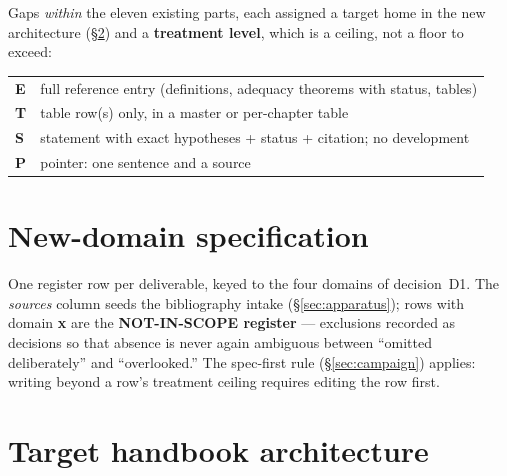 \documentclass[11pt,letterpaper]{article}
\begin{document}
Gaps \emph{within} the eleven existing parts, each assigned a target
home in the new architecture (§\ref{sec:architecture}) and a
\textbf{treatment level}, which is a ceiling, not a floor to exceed:

\begin{center}\small
\begin{tabular}{@{}lp{4.6in}@{}}
\toprule
\textbf{E} & full reference entry (definitions, adequacy theorems with status, tables) \\
\textbf{T} & table row(s) only, in a master or per-chapter table \\
\textbf{S} & statement with exact hypotheses + status + citation; no development \\
\textbf{P} & pointer: one sentence and a source \\
\bottomrule
\end{tabular}
\end{center}



\section{New-domain specification}
\label{sec:newdomains}

One register row per deliverable, keyed to the four domains of
decision~D1.  The \emph{sources} column seeds the bibliography intake
(§\ref{sec:apparatus}); rows with domain \textbf{x} are the
\textbf{NOT-IN-SCOPE register} --- exclusions recorded as decisions so
that absence is never again ambiguous between ``omitted deliberately''
and ``overlooked.''  The spec-first rule (§\ref{sec:campaign}) applies:
writing beyond a row's treatment ceiling requires editing the row first.



\section{Target handbook architecture}
\label{sec:architecture}
\end{document}

